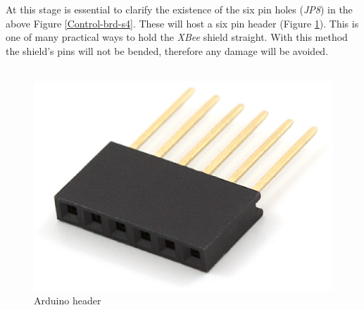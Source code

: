 \documentclass[12pt,a4paper]{report}
\begin{document}
At this stage is essential to clarify the existence of the six pin holes (\textit{JP8}) in the above Figure \ref{Control-brd-s4}.
These will host a six pin header (Figure \ref{Arduino_header}).
This is one of many practical ways to hold the \textit{XBee} shield straight.
With this method the shield's pins will not be bended, therefore any damage will be avoided.\\
\ \\
\begin{figure}[H]
\centering
\includegraphics*[scale=0.25]{arduino_header}
\caption{Arduino header}
\label{Arduino_header}
\end{figure}
%
\end{document}
